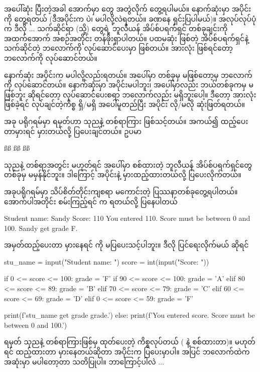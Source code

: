 အပေါ်ဆုံး  ပြီးတဲ့အခါ အောက်မှာ   တွေ အတွဲလိုက် တွေ့ရပါမယ်။ နောက်ဆုံးမှာ  အပိုင်းကို တွေ့ရတယ် (ဒီအပိုင်းက  ပဲ၊ မပါလို့လဲရတယ်။ ခဏနေ ရှင်းပြပါမယ်)။ အလုပ်လုပ်ပုံက ဒီလို $\ldots$ သက်ဆိုင်ရာ  (သို့)  တွေရဲ့ ဘူလီယန် အိပ်စ်ပရက်ရှင် တစ်ခုချင်းကို အထက်အောက် အစဉ်အတိုင်း တန်ဖိုးရှာပါတယ်။ ပထမဆုံး   ဖြစ်တဲ့ အိပ်စ်ပရက်ရှင်နဲ့ သက်ဆိုင်တဲ့ ဘလောက်ကို လုပ်\allowbreak ဆောင်ပေးမှာ ဖြစ်တယ်။ အားလုံး  ဖြစ်ရင်တော့  ဘလောက်ကို လုပ်ဆောင်တယ်။

နောက်ဆုံး  အပိုင်းက မပါလို့လည်းရတယ်။ အပေါ်မှာ တစ်ခုမှ  မဖြစ်တော့မှ  ဘလောက်ကို လုပ်ဆောင်တယ်။ နောက်ဆုံးမှာ  အပိုင်းမပါဘူး၊ အပေါ်မှာလည်း ဘယ်တစ်ခုကမှ  မဖြစ်ဘူး ဆိုရင်တော့ လုပ်ဆောင်ပေးစရာ ဘလောက်လည်း မရှိဘူးပေါ့။ ဒီတော့ အားလုံး  ဖြစ်ခဲ့ရင် လုပ်ချင်တဲ့ကိစ္စ  ရှိ/မရှိ အပေါ်မူတည်ပြီး  အပိုင်း လို/မလို ဆုံးဖြတ်ရတယ်။

အခု  ပရိုဂရမ်မှာ ရမှတ်ဟာ သုညနဲ့ တစ်ရာကြား ဖြစ်သင့်တယ်။ အကယ်၍ ထည့်ပေးတာမှားရင် မှားတယ်လို့ ပြပေးချင်တယ်။ ဥပမာ 
\begin{codetxt}
ßß
ßß
ßß
\end{codetxt}
သုညနဲ့ တစ်ရာအတွင်း မဟုတ်ရင် အပေါ်မှာ စစ်ထားတဲ့ ဘူလီယန် အိပ်စ်ပရက်ရှင်တွေ တစ်ခုမှ မမှန်နိုင်ဘူး။ ဒါကြောင့်  အပိုင်းနဲ့ မှားထည့်ထားတယ်လို့ ပြပေးလိုက်တယ်။ 

အခုပရိုဂရမ်မှာ သိပ်စိတ်တိုင်းကျစရာ မကောင်းတဲ့ ပြဿနာတစ်ခုတွေ့ရပါတယ်။ အောက်ပါအတိုင်း စမ်းကြည့်ရင်  က  ရတယ်လို့ ပြနေပါတယ်
\begin{codetxt}
Student name: Sandy
Score: 110
You entered 110. Score must be between 0 and 100.
Sandy get grade F.
\end{codetxt}
အမှတ်ထည့်ပေးတာ မှားနေရင်  ကို မပြပေးသင့်ပါဘူး။ ဒီလို ပြင်ရေးလိုက်မယ် ဆိုရင်
%
\begin{py}
stu_name = input("Student name: ")
score = int(input("Score: "))

if 0 <= score <= 100:
    grade = 'F'
    if 90 <= score <= 100:
        grade = 'A'
    elif 80 <= score <= 89:
        grade = 'B'
    elif 70 <= score <= 79:
        grade = 'C'
    elif 60 <= score <= 69:
        grade = 'D'
    elif 0 <= score <= 59:
        grade = 'F'

    print(f'{stu_name} get grade {grade}.')
else:
    print(f'You entered {score}. Score must be between 0 and 100.')
\end{py}
%
ရမှတ် သုညနဲ့ တစ်ရာကြားဖြစ်မှ  ထုတ်ပေးတဲ့ ကိစ္စလုပ်တယ် ( နဲ့ စစ်ထားတာ)။ မဟုတ်ရင်  ထည့်ထားတာ မှားနေတယ်ဆိုတာ  အပိုင်းက ပြပေးမှာပါ။ အပြင်  ဘလောက်ထဲက   အဆုံးမှာ  မပါတော့တာ သတိပြုပါ။ ဘာကြောင့်ပါလဲ  $\ldots$

